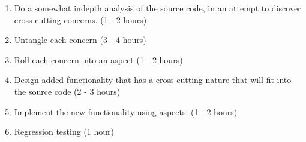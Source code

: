 \documentclass{article}
\begin{document}
\begin{enumerate}

  \item Do a somewhat indepth analysis of the source code, in an attempt to discover cross cutting concerns. (1 - 2 hours)
  \item Untangle each concern  (3 - 4 hours)
  \item Roll each concern into an aspect (1 - 2 hours)
  \item Design added functionality that has a cross cutting nature that will fit into the source code (2 - 3 hours)
  \item Implement the new functionality using aspects. (1 - 2 hours)
  \item Regression testing (1 hour)

\end{enumerate}
\end{document}
